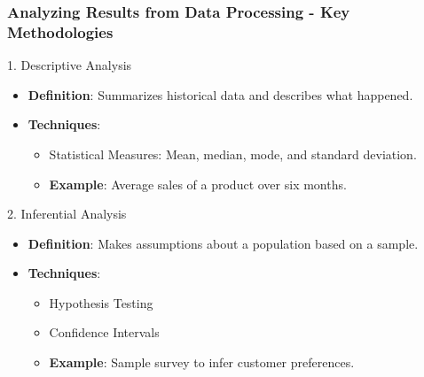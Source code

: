 \documentclass[aspectratio=169]{beamer}
\begin{document}
\begin{frame}[fragile]
    \frametitle{Analyzing Results from Data Processing - Key Methodologies}
    \begin{block}{1. Descriptive Analysis}
        \begin{itemize}
            \item \textbf{Definition}: Summarizes historical data and describes what happened.
            \item \textbf{Techniques}: 
                \begin{itemize}
                    \item Statistical Measures: Mean, median, mode, and standard deviation.
                    \item \textbf{Example}: Average sales of a product over six months.
                \end{itemize}
        \end{itemize}
    \end{block}

    \begin{block}{2. Inferential Analysis}
        \begin{itemize}
            \item \textbf{Definition}: Makes assumptions about a population based on a sample.
            \item \textbf{Techniques}:
                \begin{itemize}
                    \item Hypothesis Testing
                    \item Confidence Intervals
                    \item \textbf{Example}: Sample survey to infer customer preferences.
                \end{itemize}
        \end{itemize}
    \end{block}
\end{frame}
\end{document}
